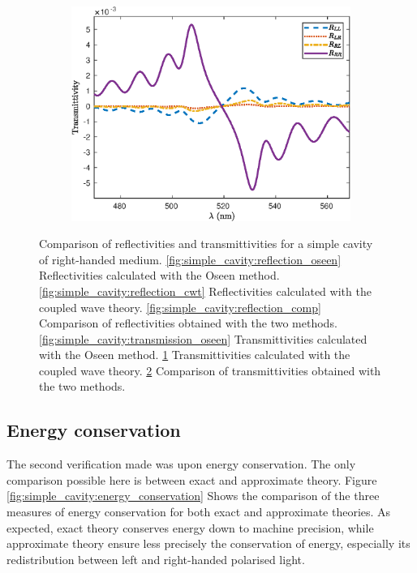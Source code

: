 \begin{figure}
\begin{subfigure}{0.32\linewidth}
		\caption{}
		\label{fig:simple_cavity:transmission_cwt}
	\end{subfigure}
	\begin{subfigure}{0.32\linewidth}
		\includegraphics[width=\linewidth]{plots/simple/transmission_comp}
		\caption{}
		\label{fig:simple_cavity:transmission_comp}
	\end{subfigure}
	\caption[Comparison of reflectivities and transmittivities for a simple cavity]{Comparison of reflectivities and transmittivities for a simple cavity of right-handed medium. \ref{fig:simple_cavity:reflection_oseen} Reflectivities calculated with the Oseen method. \ref{fig:simple_cavity:reflection_cwt} Reflectivities calculated with the coupled wave theory. \ref{fig:simple_cavity:reflection_comp} Comparison of reflectivities obtained with the two methods. \ref{fig:simple_cavity:transmission_oseen} Transmittivities calculated with the Oseen method. \ref{fig:simple_cavity:transmission_cwt} Transmittivities calculated with the coupled wave theory. \ref{fig:simple_cavity:transmission_comp} Comparison of transmittivities obtained with the two methods.}
	\label{fig:simple_cavity:reflection}
\end{figure}

\subsection{Energy conservation}

The second verification made was upon energy conservation. The only comparison possible here is between exact and approximate theory. Figure \ref{fig:simple_cavity:energy_conservation} Shows the comparison of the three measures of energy conservation for both exact and approximate theories. As expected, exact theory conserves energy down to machine precision, while approximate theory ensure less precisely the conservation of energy, especially its redistribution between left and right-handed polarised light.

